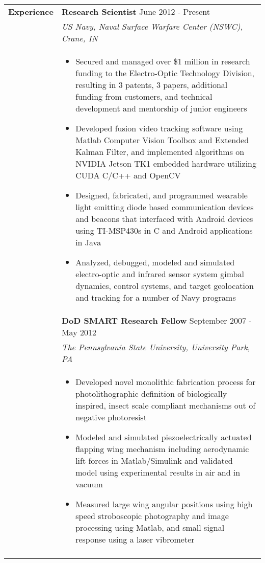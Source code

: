 \documentclass{article}[16pt]
\newlength{\lcolw}
\newlength{\rcolw}
\newlength{\hlcolw}
\newlength{\itemmargin}
\begin{document}
\begin{tabular}{L{\hlcolw}  L{\rcolw}}
\textbf{\Large Experience} & \textbf{\large Research Scientist} \hfill {\large June 2012 - Present}  \\
& \textit{\large US Navy, Naval Surface Warfare Center (NSWC), Crane, IN} \\ 
&
\vspace{-0.2in} 
\begin{itemize} [leftmargin = \itemmargin]
	\item Secured and managed over \$1 million in research funding to the Electro-Optic Technology Division, resulting in 3 patents, 3 papers, additional funding from customers, and technical development and mentorship of junior engineers
	\item Developed fusion video tracking software using Matlab Computer Vision Toolbox and Extended Kalman Filter, and implemented algorithms on NVIDIA Jetson TK1 embedded hardware utilizing CUDA C/C++ and OpenCV
	\item Designed, fabricated, and programmed wearable light emitting diode based communication devices and beacons that interfaced with Android devices using TI-MSP430s in C and Android applications in Java	
	\item Analyzed, debugged, modeled and simulated electro-optic and infrared sensor system gimbal dynamics, control systems, and target geolocation and tracking for a number of Navy programs
	
\end{itemize} \\

& \textbf{\large DoD SMART Research Fellow} \hfill {\large September 2007 - May 2012}  \\
& \textit{\large The Pennsylvania State University, University Park, PA} \\ 
& 
\vspace{-0.2in} 

	\begin{itemize}[leftmargin = \itemmargin]
	\item Developed novel monolithic fabrication process for photolithographic definition of biologically inspired, insect scale compliant mechanisms out of negative photoresist
	\item Modeled and simulated piezoelectrically actuated flapping wing mechanism including aerodynamic lift forces in Matlab/Simulink and validated model using experimental results in air and in vacuum
	\item Measured large wing angular positions using high speed stroboscopic photography and image processing using Matlab, and small signal response using a laser vibrometer
	\end{itemize} \\
	\hline \\ 
\end{tabular}
\end{document}

